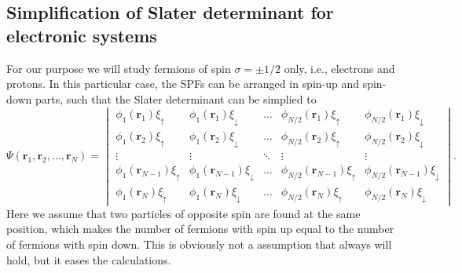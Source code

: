 \subsection{Simplification of Slater determinant for electronic systems} \label{subsubsec:electronsystem}
For our purpose we will study fermions of spin $\sigma=\pm 1/2$ only, i.e., electrons and protons. In this particular case, the SPFs can be arranged in spin-up and spin-down parts, such that the Slater determinant can be simplied to 
\begin{equation*}
\Psi(\boldsymbol{r}_1,\boldsymbol{r}_2,\hdots,\boldsymbol{r}_N)=
\begin{vmatrix}
\phi_1(\boldsymbol{r}_1)\xi_{\uparrow} & \phi_1(\boldsymbol{r}_1)\xi_{\downarrow} & \hdots & \phi_{N/2}(\boldsymbol{r}_1)\xi_{\uparrow} & \phi_{N/2}(\boldsymbol{r}_1)\xi_{\downarrow}\\
\phi_1(\boldsymbol{r}_2)\xi_{\uparrow} & \phi_1(\boldsymbol{r}_2)\xi_{\downarrow} & \hdots & \phi_{N/2}(\boldsymbol{r}_2)\xi_{\uparrow} & \phi_{N/2}(\boldsymbol{r}_2)\xi_{\downarrow}\\
\vdots & \vdots & \ddots & \vdots & \vdots\\
\phi_1(\boldsymbol{r}_{N-1})\xi_{\uparrow} & \phi_1(\boldsymbol{r}_{N-1})\xi_{\downarrow} & \hdots & \phi_{N/2}(\boldsymbol{r}_{N-1})\xi_{\uparrow} & \phi_{N/2}(\boldsymbol{r}_{N-1})\xi_{\downarrow}\\
\phi_1(\boldsymbol{r}_N)\xi_{\uparrow} & \phi_1(\boldsymbol{r}_N)\xi_{\downarrow} & \hdots & \phi_{N/2}(\boldsymbol{r}_N)\xi_{\uparrow} & \phi_{N/2}(\boldsymbol{r}_N)\xi_{\downarrow}
\end{vmatrix}.
\end{equation*}
Here we assume that two particles of opposite spin are found at the same position, which makes the number of fermions with spin up equal to the number of fermions with spin down. This is obviously not a assumption that always will hold, but it eases the calculations. 

